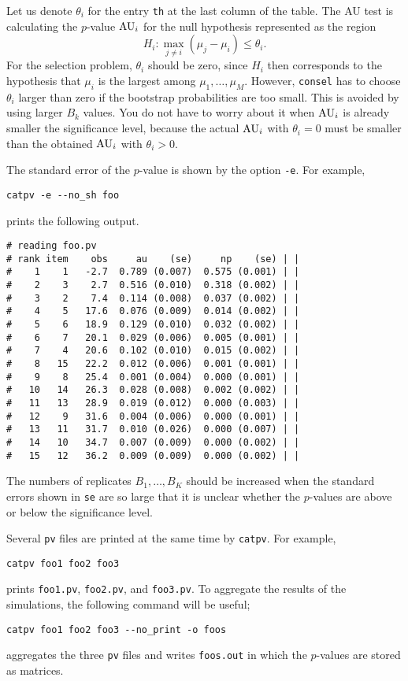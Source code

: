 \documentclass[12pt]{article}
\begin{document}
Let us denote $\theta_i$ for the entry {\tt th} at the last column of
the table. The AU test is calculating the $p$-value ${\rm AU}_i$ for the
null hypothesis represented as the region \[ H_i: \max_{j\neq i} (\mu_j
- \mu_i) \le \theta_i.  \] For the selection problem, $\theta_i$ should
be zero, since $H_i$ then corresponds to the hypothesis that $\mu_i$ is
the largest among $\mu_1,\ldots,\mu_M$. However, {\tt consel} has to
choose $\theta_i$ larger than zero if the bootstrap probabilities are
too small. This is avoided by using larger $B_k$ values. You do not have
to worry about it when ${\rm AU}_i$ is already smaller the significance
level, because the actual ${\rm AU}_i$ with $\theta_i=0$ must be smaller
than the obtained ${\rm AU}_i$ with $\theta_i>0$.

The standard error of the $p$-value is shown by the option {\tt -e}.
For example,
\begin{verbatim}
catpv -e --no_sh foo
\end{verbatim}
prints the following output.
{\small
\begin{verbatim}
# reading foo.pv
# rank item    obs     au    (se)     np    (se) | |
#    1    1   -2.7  0.789 (0.007)  0.575 (0.001) | |
#    2    3    2.7  0.516 (0.010)  0.318 (0.002) | |
#    3    2    7.4  0.114 (0.008)  0.037 (0.002) | |
#    4    5   17.6  0.076 (0.009)  0.014 (0.002) | |
#    5    6   18.9  0.129 (0.010)  0.032 (0.002) | |
#    6    7   20.1  0.029 (0.006)  0.005 (0.001) | |
#    7    4   20.6  0.102 (0.010)  0.015 (0.002) | |
#    8   15   22.2  0.012 (0.006)  0.001 (0.001) | |
#    9    8   25.4  0.001 (0.004)  0.000 (0.001) | |
#   10   14   26.3  0.028 (0.008)  0.002 (0.002) | |
#   11   13   28.9  0.019 (0.012)  0.000 (0.003) | |
#   12    9   31.6  0.004 (0.006)  0.000 (0.001) | |
#   13   11   31.7  0.010 (0.026)  0.000 (0.007) | |
#   14   10   34.7  0.007 (0.009)  0.000 (0.002) | |
#   15   12   36.2  0.009 (0.009)  0.000 (0.002) | |
\end{verbatim}}
The numbers of replicates $B_1,\ldots,B_K$ should be increased when the
standard errors shown in {\tt se} are so large that it is unclear
whether the $p$-values are above or below the significance level.

Several {\tt pv} files are printed at the same time by {\tt catpv}. For
example,
\begin{verbatim}
catpv foo1 foo2 foo3	
\end{verbatim}
prints {\tt foo1.pv}, {\tt foo2.pv}, and {\tt foo3.pv}. To aggregate the
results of the simulations, the following command will be useful;
\begin{verbatim}
catpv foo1 foo2 foo3 --no_print -o foos
\end{verbatim}
aggregates the three {\tt pv} files and writes {\tt foos.out} in which
the $p$-values are stored as matrices.
\end{document}
